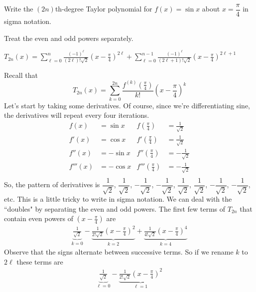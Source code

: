 \begin{question}
Write the $(2n)$th-degree Taylor polynomial for $f(x)=\sin x$ about $x=\dfrac{\pi}{4}$ in sigma notation.
\end{question}
\begin{hint}
Treat the even and odd powers separately.
\end{hint}
\begin{answer}
$T_{2n}(x)=\sum_{\ell=0}^{n}\frac{(-1)^\ell}{(2\ell)!\sqrt{2}}\left(x-\frac{\pi}{4}\right)^{2\ell}
+\sum_{\ell=0}^{n-1}\frac{(-1)^\ell}{(2\ell+1)!\sqrt{2}}\left(x-\frac{\pi}{4}\right)^{2\ell+1}$
\end{answer}
\begin{solution}
Recall that
\begin{equation*}
T_{2n}(x)=\sum_{k=0}^{2n} \frac{f^{(k)}\left(\frac{\pi}{4}\right)}{k!}\left(x-\frac{\pi}{4}\right)^k
\end{equation*}
Let's start by taking some derivatives. Of course, since we're differentiating sine, the derivatives will repeat every four iterations.
\begin{align*}
f(x)&=\sin x & f\left(\frac{\pi}{4}\right)&=\frac{1}{\sqrt 2}\\
f'(x)&=\cos x & f'\left(\frac{\pi}{4}\right)&=\frac{1}{\sqrt{2}}\\
f''(x)&=-\sin x & f''\left(\frac{\pi}{4}\right)&=-\frac{1}{\sqrt 2}\\
f'''(x)&=-\cos x & f'''\left(\frac{\pi}{4}\right)&=-\frac{1}{\sqrt{2}}\\
\end{align*}
So, the pattern of derivatives is $\dfrac{1}{\sqrt{2}}$, $\dfrac{1}{\sqrt{2}}$, $-\dfrac{1}{\sqrt{2}}$, $-\dfrac{1}{\sqrt{2}}$, $\dfrac{1}{\sqrt{2}}$, $\dfrac{1}{\sqrt{2}}$, $-\dfrac{1}{\sqrt{2}}$, $-\dfrac{1}{\sqrt{2}}$, etc. This is a little tricky to write in sigma notation. We can deal with the ``doubles" by separating the even and odd powers. The first few terms of $T_{2n}$ that contain even powers of $\left(x-\frac{\pi}{4}\right)$ are
\begin{align*}
\underbrace{\frac{1}{\sqrt{2}}}_{k=0}
-\underbrace{\frac{1}{2!\sqrt{2}}\left(x-\frac{\pi}{4}\right)^{2}}_{k=2}
+\underbrace{\frac{1}{4!\sqrt{2}}\left(x-\frac{\pi}{4}\right)^{4}}_{k=4}
\end{align*}
Observe that the signs alternate between successive terms. So if we rename $k$ to $2\ell$ these terms are
\begin{align*}
\underbrace{\frac{1}{\sqrt{2}}}_{\ell=0}
-\underbrace{\frac{1}{2!\sqrt{2}}\left(x-\frac{\pi}{4}\right)^{2}}_{\ell=1}

\end{align*}
\end{solution}
